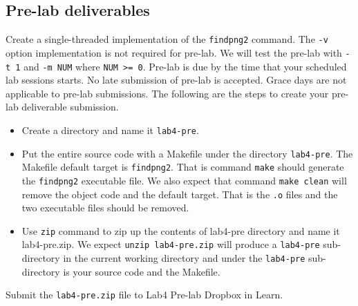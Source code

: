 \subsection{Pre-lab deliverables}
\label{sec:lab4-pre-lab-deliverable}
Create a single-threaded implementation of the \verb+findpng2+ command. The \verb+-v+ option implementation is not required for pre-lab. We will test the pre-lab with \verb+-t 1+ and \verb+-m NUM+ where \verb+NUM >= 0+. Pre-lab is due by the time that your scheduled lab sessions starts. No late submission of pre-lab is accepted. Grace days are not applicable to pre-lab submissions. The following are the steps to create your pre-lab deliverable submission.
\begin{itemize}
\item Create a directory and name it \verb+lab4-pre+.
\item Put the entire source code with a Makefile under the directory \verb+lab4-pre+. The Makefile default target is \verb+findpng2+. That is command \verb+make+ should generate the \verb+findpng2+ executable file. We also expect that command \verb+make clean+ will remove the object code and the default target. That is the \verb+.o+ files and the two executable files should be removed.
\item Use \verb+zip+ command to zip up the contents of lab4-pre directory and name it lab4-pre.zip. We expect \verb+unzip lab4-pre.zip+ will produce a \verb+lab4-pre+ sub-directory in the current working directory and under the \verb+lab4-pre+ sub-directory is your source code and the Makefile.
\end{itemize}
Submit the \verb+lab4-pre.zip+ file to Lab4 Pre-lab Dropbox in Learn.

